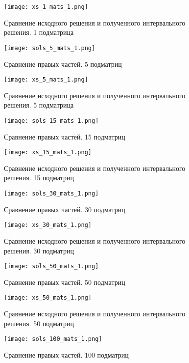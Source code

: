 \begin{figure}[h]
	\centering
	\texttt{[image: xs\_1\_mats\_1.png]}
	\caption{Сравнение исходного решения и полученного интервального решения. 1 подматрица}
\end{figure}
\newpage
\begin{figure}[h]
	\centering
	\texttt{[image: sols\_5\_mats\_1.png]}
	\caption{Сравнение правых частей. 5 подматриц}
\end{figure}

\begin{figure}[h]
	\centering
	\texttt{[image: xs\_5\_mats\_1.png]}
	\caption{Сравнение исходного решения и полученного интервального решения. 5 подматрица}
\end{figure}
\newpage
\begin{figure}[h]
	\centering
	\texttt{[image: sols\_15\_mats\_1.png]}
	\caption{Сравнение правых частей. 15 подматриц}
\end{figure}

\begin{figure}[h]
	\centering
	\texttt{[image: xs\_15\_mats\_1.png]}
	\caption{Сравнение исходного решения и полученного интервального решения. 15 подматриц}
\end{figure}
\newpage
\begin{figure}[h]
	\centering
	\texttt{[image: sols\_30\_mats\_1.png]}
	\caption{Сравнение правых частей. 30 подматриц}
\end{figure}

\begin{figure}[h]
	\centering
	\texttt{[image: xs\_30\_mats\_1.png]}
	\caption{Сравнение исходного решения и полученного интервального решения. 30 подматриц}
\end{figure}
\newpage
\begin{figure}[h]
	\centering
	\texttt{[image: sols\_50\_mats\_1.png]}
	\caption{Сравнение правых частей. 50 подматриц}
\end{figure}

\begin{figure}[h]
	\centering
	\texttt{[image: xs\_50\_mats\_1.png]}
	\caption{Сравнение исходного решения и полученного интервального решения. 50 подматриц}
\end{figure}
\newpage
\begin{figure}[h]
	\centering
	\texttt{[image: sols\_100\_mats\_1.png]}
	\caption{Сравнение правых частей. 100 подматриц}
\end{figure}

